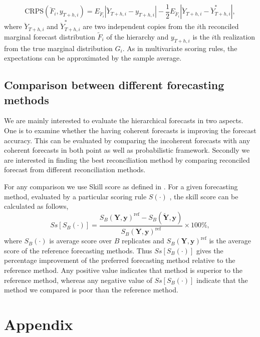 \documentclass[graybox]{svmult}
\begin{document}
\begin{equation} \label{eq:24}
\text{CRPS}(\breve{F}_i,y_{T+h,i}) = E_{\breve{F}_i}|\breve{Y}_{T+h,i}-y_{T+h,i}| - \frac{1}{2}E_{\breve{F}_i}|\breve{Y}_{T+h,i}-\breve{Y}^*_{T+h,i}|,
\end{equation} 
where $\breve{Y}_{T+h,i}$ and $\breve{Y}^*_{T+h,i}$ are two independent copies from the $i$th reconciled marginal forecast distribution $\tilde{F}_i$ of the hierarchy and $y_{T+h,i}$ is the $i$th realization from the true marginal distribution $G_i$. As in multivariate scoring rules, the expectations can be approximated by the sample average.

\subsection{Comparison between different forecasting methods}

We are mainly interested to evaluate the hierarchical forecasts in two aspects. One is to examine whether the having coherent forecasts is improving the forecast accuracy. This can be evaluated by comparing the incoherent forecasts with any coherent forecasts in both point as well as probabilistic framework. Secondly we are interested in finding the best reconciliation method by comparing reconciled forecast from different reconciliation methods. 

For any comparison we use Skill score as defined in \citep{Gneiting2007}. For a given forecasting method, evaluated by a particular scoring rule $S(\cdot)$ , the skill score can be calculated as follows,
\begin{equation} \label{eq:25}
Ss[S_B(\cdot)] = \frac{S_B(\bm{Y},\bm{y})^{\text{ref}} - S_B(\breve{\bm{Y}},\bm{y})}{S_B(\bm{Y},\bm{y})^{\text{ref}}}\times 100\%,
\end{equation}
where $S_B(\cdot)$ is average score over $B$ replicates and $S_B(\bm{Y},\bm{y})^{\text{ref}}$ is the average score of the reference forecasting methods. Thus $Ss[S_B(\cdot)]$ gives the percentage improvement of the preferred forecasting method relative to the reference method. Any positive value indicates that method is superior to the reference method, whereas any negative value of $Ss[S_B(\cdot)]$ indicate that the method we compared is poor than the reference method. 




\pagebreak



\section*{Appendix}
\end{document}
